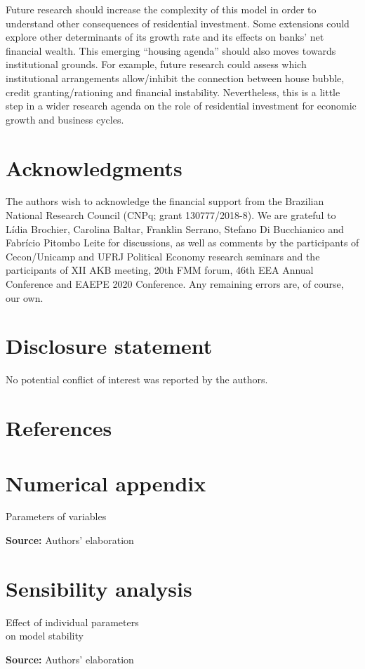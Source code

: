 \documentclass[12pt, a4]{article}
\begin{document}
Future research should increase the complexity of this model in order to understand other consequences of residential investment.
Some extensions could explore other determinants of its growth rate and  its effects on banks' net financial wealth.
This emerging ``housing agenda'' should also moves towards institutional grounds.
For example, future research could assess which institutional arrangements allow/inhibit the connection between house bubble, credit granting/rationing and financial instability.
Nevertheless, this is a little step in a wider research agenda on the role of residential investment for economic growth and business cycles.


\section*{Acknowledgments}
\label{sec:org689d948}
The authors wish to acknowledge the financial support from the Brazilian National Research Council (CNPq; grant 130777/2018-8). We  are  grateful  to  Lídia  Brochier,  Carolina  Baltar,  Franklin  Serrano, Stefano Di Bucchianico  and Fabrício Pitombo Leite for  discussions,  as  well  as  comments  by  the participants of Cecon/Unicamp and UFRJ Political Economy research seminars and the participants of XII AKB meeting, 20th FMM forum, 46th EEA Annual Conference and EAEPE 2020 Conference. Any remaining errors are, of course, our own.

\section*{Disclosure statement}
\label{sec:org02d5ded}
No potential conflict of interest was reported by the authors.


\section*{References}
\label{sec:orgc6c52ad}
\printbibliography[heading=none]


\appendix

\section{Numerical appendix}
\label{sec:org50eff00}
\label{append:Data}


\begin{table}[H]
\caption{Parameters of variables}
\centering
\label{tab:param}

\caption*{\textbf{Source:} Authors' elaboration}
\end{table}

\section{Sensibility analysis}
\label{sec:org0b2fcc5}
\label{append:Sensib}
\begin{table}[H]
\caption{Effect of individual parameters\\on model stability}
\label{tab:sensibility}
\centering

\caption*{\textbf{Source:} Authors' elaboration}
\end{table}
\end{document}
